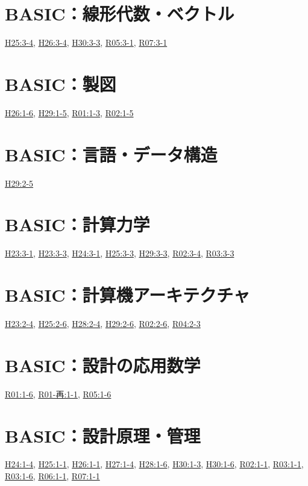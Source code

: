 \section{BASIC：線形代数・ベクトル}
\hyperref[q:h25-reg-basic-3-4]{H25:3-4}, \hyperref[q:h26-reg-basic-3-4]{H26:3-4}, \hyperref[q:h30-reg-basic-3-3]{H30:3-3}, \hyperref[q:r05-reg-basic-3-1]{R05:3-1}, \hyperref[q:r07-reg-basic-3-1]{R07:3-1}
\section{BASIC：製図}
\hyperref[q:h26-reg-basic-1-6]{H26:1-6}, \hyperref[q:h29-reg-basic-1-5]{H29:1-5}, \hyperref[q:r01-reg-basic-1-3]{R01:1-3}, \hyperref[q:r02-reg-basic-1-5]{R02:1-5}
\section{BASIC：言語・データ構造}
\hyperref[q:h29-reg-basic-2-5]{H29:2-5}
\section{BASIC：計算力学}
\hyperref[q:h23-reg-basic-3-1]{H23:3-1}, \hyperref[q:h23-reg-basic-3-3]{H23:3-3}, \hyperref[q:h24-reg-basic-3-1]{H24:3-1}, \hyperref[q:h25-reg-basic-3-3]{H25:3-3}, \hyperref[q:h29-reg-basic-3-3]{H29:3-3}, \hyperref[q:r02-reg-basic-3-4]{R02:3-4}, \hyperref[q:r03-reg-basic-3-3]{R03:3-3}
\section{BASIC：計算機アーキテクチャ}
\hyperref[q:h23-reg-basic-2-4]{H23:2-4}, \hyperref[q:h25-reg-basic-2-6]{H25:2-6}, \hyperref[q:h28-reg-basic-2-4]{H28:2-4}, \hyperref[q:h29-reg-basic-2-6]{H29:2-6}, \hyperref[q:r02-reg-basic-2-6]{R02:2-6}, \hyperref[q:r04-reg-basic-2-3]{R04:2-3}
\section{BASIC：設計の応用数学}
\hyperref[q:r01-reg-basic-1-6]{R01:1-6}, \hyperref[q:r01-ret-basic-1-1]{R01-再:1-1}, \hyperref[q:r05-reg-basic-1-6]{R05:1-6}
\section{BASIC：設計原理・管理}
\hyperref[q:h24-reg-basic-1-4]{H24:1-4}, \hyperref[q:h25-reg-basic-1-1]{H25:1-1}, \hyperref[q:h26-reg-basic-1-1]{H26:1-1}, \hyperref[q:h27-reg-basic-1-4]{H27:1-4}, \hyperref[q:h28-reg-basic-1-6]{H28:1-6}, \hyperref[q:h30-reg-basic-1-3]{H30:1-3}, \hyperref[q:h30-reg-basic-1-6]{H30:1-6}, \hyperref[q:r02-reg-basic-1-1]{R02:1-1}, \hyperref[q:r03-reg-basic-1-1]{R03:1-1}, \hyperref[q:r03-reg-basic-1-6]{R03:1-6}, \hyperref[q:r06-reg-basic-1-1]{R06:1-1}, \hyperref[q:r07-reg-basic-1-1]{R07:1-1}
